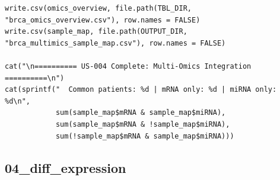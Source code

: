 \documentclass[12pt,a4paper]{ctexart}
\begin{document}
\begin{lstlisting}[caption={03_integrate_omics}, basicstyle=\ttfamily\scriptsize]
write.csv(omics_overview, file.path(TBL_DIR, "brca_omics_overview.csv"), row.names = FALSE)
write.csv(sample_map, file.path(OUTPUT_DIR, "brca_multimics_sample_map.csv"), row.names = FALSE)

cat("\n========== US-004 Complete: Multi-Omics Integration ==========\n")
cat(sprintf("  Common patients: %d | mRNA only: %d | miRNA only: %d\n",
            sum(sample_map$mRNA & sample_map$miRNA),
            sum(sample_map$mRNA & !sample_map$miRNA),
            sum(!sample_map$mRNA & sample_map$miRNA)))
\end{lstlisting}

\subsection{04_diff_expression}
\end{document}
